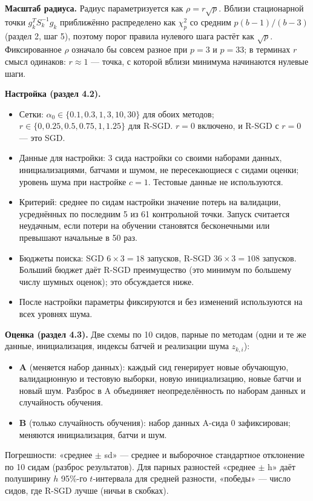\documentclass[11pt,a4paper]{article}
\begin{document}
\textbf{Масштаб радиуса.} Радиус параметризуется как $\rho=r\sqrt p$. Вблизи стационарной
точки $g_k^TS_k^{-1}g_k$ приближённо распределено как $\chi^2_p$ со средним $p(b-1)/(b-3)$
(раздел 2, шаг 5), поэтому порог правила нулевого шага растёт как $\sqrt p$. Фиксированное
$\rho$ означало бы совсем разное при $p=3$ и $p=33$; в терминах $r$ смысл одинаков: $r\approx1$
— точка, с которой вблизи минимума начинаются нулевые шаги.

\textbf{Настройка (раздел 4.2).}
\begin{itemize}
\item Сетки: $\alpha_0\in\{0.1,0.3,1,3,10,30\}$ для обоих методов; $r\in\{0,0.25,0.5,0.75,1,1.25\}$
для R-SGD. $r=0$ включено, и R-SGD с $r=0$ — это SGD.
\item Данные для настройки: 3 сида настройки со своими наборами данных, инициализациями, батчами и
шумом, не пересекающиеся с сидами оценки; уровень шума при настройке $c=1$. Тестовые данные не
используются.
\item Критерий: среднее по сидам настройки значение потерь на валидации, усреднённых по последним
5 из 61 контрольной точки. Запуск считается неудачным, если потери на обучении становятся
бесконечными или превышают начальные в 50 раз.
\item Бюджеты поиска: SGD $6\times3=18$ запусков, R-SGD $36\times3=108$ запусков. Больший бюджет
даёт R-SGD преимущество (это минимум по большему числу шумных оценок); это обсуждается ниже.
\item После настройки параметры фиксируются и без изменений используются на всех уровнях шума.
\end{itemize}

\textbf{Оценка (раздел 4.3).} Две схемы по 10 сидов, парные по методам (одни и те же данные,
инициализация, индексы батчей и реализации шума $z_{k,i}$):
\begin{itemize}
\item \textbf{A} (меняется набор данных): каждый сид генерирует новые обучающую, валидационную и
тестовую выборки, новую инициализацию, новые батчи и новый шум. Разброс в A объединяет
неопределённость по наборам данных и случайность обучения.
\item \textbf{B} (только случайность обучения): набор данных A-сида 0 зафиксирован; меняются
инициализация, батчи и шум.
\end{itemize}
Погрешности: «среднее $\pm$ sd» — среднее и выборочное стандартное отклонение по 10 сидам
(разброс результатов). Для парных разностей «среднее $\pm$ h» даёт полуширину $h$
95\%-го $t$-интервала для средней разности, «победы» — число сидов, где R-SGD лучше (ничьи в
скобках).
\end{document}
